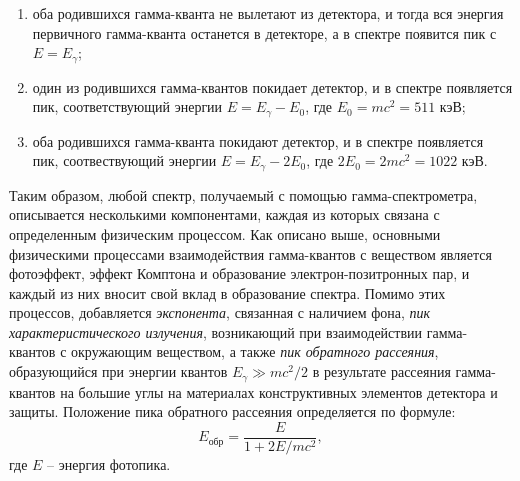 \documentclass[12pt,a4paper]{article}
\begin{document}
\begin{enumerate}
\item оба родившихся гамма-кванта не вылетают из детектора, и тогда вся энергия первичного гамма-кванта останется в детекторе, а в спектре появится пик с $E=E_{\gamma}$;
\item один из родившихся гамма-квантов покидает детектор, и в спектре появляется пик, соответствующий энергии $E=E_{\gamma}-E_0$, где $E_0=mc^2=511$ кэВ;
\item оба родившихся гамма-кванта покидают детектор, и в спектре появляется пик, соотвествующий энергии $E=E_{\gamma}-2E_0$, где $2E_0=2mc^2=1022$ кэВ.
\end{enumerate}
Таким образом, любой спектр, получаемый с помощью гамма-спектрометра, описывается несколькими компонентами, каждая из которых связана с определенным физическим процессом. Как описано выше, основными физическими процессами взаимодействия гамма-квантов с веществом является фотоэффект, эффект Комптона и образование электрон-позитронных пар, и каждый из них вносит свой вклад в образование спектра. Помимо этих процессов, добавляется \textit{экспонента}, связанная с наличием фона, \textit{пик характеристического излучения}, возникающий при взаимодействии гамма-квантов с окружающим веществом, а также \textit{пик обратного рассеяния}, образующийся при энергии квантов $E_{\gamma}\gg mc^2/2$ в результате рассеяния гамма-квантов на большие углы на материалах  конструктивных элементов детектора и защиты. Положение пика обратного рассеяния определяется по формуле:
\begin{equation}
E_{\text{обр}}=\frac{E}{1+2E/mc^2},
\label{eq:Ereverse}
\end{equation}
где $E$ -- энергия фотопика.\par
\end{document}
